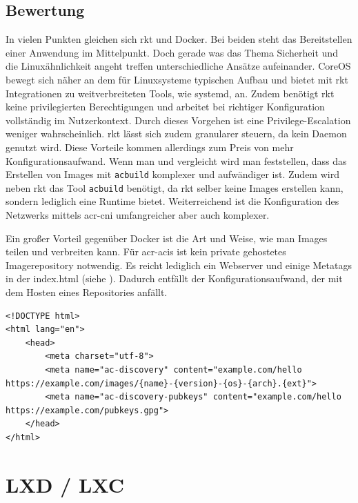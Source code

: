 \subsection{Bewertung}
\label{sec:compRktBewertung}
In vielen Punkten gleichen sich rkt und Docker. Bei beiden steht das Bereitstellen einer Anwendung im Mittelpunkt. Doch gerade was das Thema Sicherheit und die Linuxähnlichkeit angeht treffen unterschiedliche Ansätze aufeinander. CoreOS bewegt sich näher an dem für Linuxsysteme typischen Aufbau und bietet mit rkt Integrationen zu weitverbreiteten Tools, wie systemd, an. Zudem benötigt rkt keine privilegierten Berechtigungen und arbeitet bei richtiger Konfiguration vollständig im Nutzerkontext. Durch dieses Vorgehen ist eine Privilege-Escalation weniger wahrscheinlich. rkt lässt sich zudem granularer steuern, da kein Daemon genutzt wird. Diese Vorteile kommen allerdings zum Preis von mehr Konfigurationsaufwand. Wenn man  und  vergleicht wird man feststellen, dass das Erstellen von Images mit \texttt{acbuild} komplexer und aufwändiger ist. Zudem wird neben rkt das Tool \texttt{acbuild} benötigt, da rkt selber keine Images erstellen kann, sondern lediglich eine Runtime bietet. Weiterreichend ist die Konfiguration des Netzwerks mittels \gls{acr-cni} umfangreicher aber auch komplexer.

Ein großer Vorteil gegenüber Docker ist die Art und Weise, wie man Images teilen und verbreiten kann. Für \glspl{acr-aci} ist kein private gehostetes Imagerepository notwendig. Es reicht lediglich ein Webserver und einige Metatags in der index.html (siehe ). Dadurch entfällt der Konfigurationsaufwand, der mit dem Hosten eines Repositories anfällt.

\begin{listing}
	\begin{verbatim}
<!DOCTYPE html>
<html lang="en">
	<head>
		<meta charset="utf-8">
		<meta name="ac-discovery" content="example.com/hello https://example.com/images/{name}-{version}-{os}-{arch}.{ext}">
		<meta name="ac-discovery-pubkeys" content="example.com/hello https://example.com/pubkeys.gpg">
	</head>
</html>
	\end{verbatim}
	\caption{index.html mit Metatags um \glspl{acr-aci} bereitzustellen}
	\label{lst:rktReposHTML}
\end{listing}

\pagebreak

\section{LXD / LXC}
\label{sec:compLXD}

